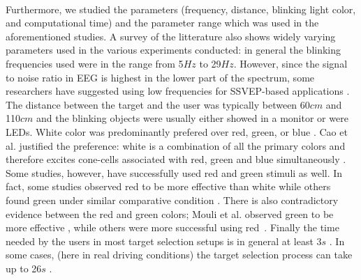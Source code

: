 \documentclass[smallextended]{svjour3}
\begin{document}
\\
Furthermore, we studied the parameters (frequency, distance, blinking light color, and computational time) and the parameter range which was used in the aforementioned studies.
A survey of the litterature also shows widely varying parameters used in the various experiments conducted:
in general the blinking frequencies used were in the range from 5$Hz$ to 29$Hz$.
However, since the signal to noise ratio in EEG is highest in the lower part of the spectrum, some researchers have suggested using low frequencies for SSVEP-based applications \cite{paper6}.
The distance between the target and the user was typically between 60$cm$ and 110$cm$ and the blinking objects were usually either showed in a monitor or were LEDs. White color was predominantly prefered over red, green, or blue \cite{paper6,aljshamee2014beyond,aljshamee2016discriminate,cao2012flashing,paper2}. Cao et al. justified the preference: white is a combination of all the primary colors and therefore excites cone-cells associated with red, green and blue simultaneously \cite{cao2012flashing}. Some studies, however, have successfully used red \cite{paper_5,jian2014improving,paper4} and green \cite{chua2004effects,duvinage2013performance,SSVEPfiability,hvaring2014comparison,paper4,mouli2013performance} stimuli as well.
In fact, some studies observed red to be more effective than white \cite{paper_5,hvaring2014comparison} while others found green under similar comparative condition \cite{chua2004effects,duvinage2013performance}. There is also contradictory evidence between the red and green colors; Mouli et al. observed green to be more effective \cite{mouli2013performance}, while others were more successful using red~\cite{cao2012flashing}.
Finally the time needed by the users in most target selection setups is in general at least 3$s$ \cite{car,SSVEPfiability,jian2014improving,paper4}.
In some cases, (here in real driving conditions) the target selection process can take up to 26$s$ \cite{car}.
\end{document}
